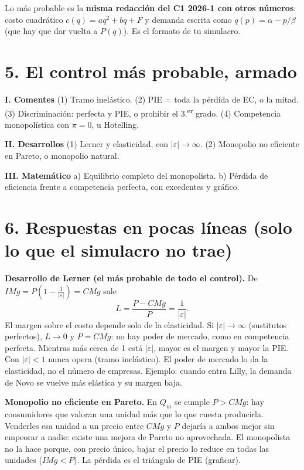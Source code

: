 \documentclass[11pt]{article}
\begin{document}
Lo más probable es la \textbf{misma redacción del C1 2026-1 con otros números}: costo cuadrático $c(q) = aq^{2} + bq + F$ y demanda escrita como $q(p) = \alpha - p/\beta$ (que hay que dar vuelta a $P(q)$). Es el formato de tu simulacro.

\section*{5. El control más probable, armado}

\begin{clave}
\textbf{I. Comentes} \quad (1) Tramo inelástico. \quad (2) PIE = toda la pérdida de EC, o la mitad. \quad (3) Discriminación: perfecta y PIE, o prohibir el 3.\textsuperscript{er} grado. \quad (4) Competencia monopolística con $\pi = 0$, u Hotelling.

\textbf{II. Desarrollos} \quad (1) Lerner y elasticidad, con $|\varepsilon| \to \infty$. \quad (2) Monopolio no eficiente en Pareto, o monopolio natural.

\textbf{III. Matemático} \quad a) Equilibrio completo del monopolista. \quad b) Pérdida de eficiencia frente a competencia perfecta, con excedentes y gráfico.
\end{clave}

\section*{6. Respuestas en pocas líneas (solo lo que el simulacro no trae)}

\textbf{Desarrollo de Lerner (el más probable de todo el control).} De $IMg = P\left(1 - \frac{1}{|\varepsilon|}\right) = CMg$ sale
\[
L = \frac{P - CMg}{P} = \frac{1}{|\varepsilon|}.
\]
El margen sobre el costo depende solo de la elasticidad. Si $|\varepsilon| \to \infty$ (sustitutos perfectos), $L \to 0$ y $P = CMg$: no hay poder de mercado, como en competencia perfecta. Mientras más cerca de 1 está $|\varepsilon|$, mayor es el margen y mayor la PIE. Con $|\varepsilon| < 1$ nunca opera (tramo inelástico). El poder de mercado lo da la elasticidad, no el número de empresas. Ejemplo: cuando entra Lilly, la demanda de Novo se vuelve más elástica y su margen baja.

\textbf{Monopolio no eficiente en Pareto.} En $Q_m$ se cumple $P > CMg$: hay consumidores que valoran una unidad más que lo que cuesta producirla. Venderles esa unidad a un precio entre $CMg$ y $P$ dejaría a ambos mejor sin empeorar a nadie: existe una mejora de Pareto no aprovechada. El monopolista no la hace porque, con precio único, bajar el precio lo reduce en todas las unidades ($IMg < P$). La pérdida es el triángulo de PIE (graficar).
\end{document}
